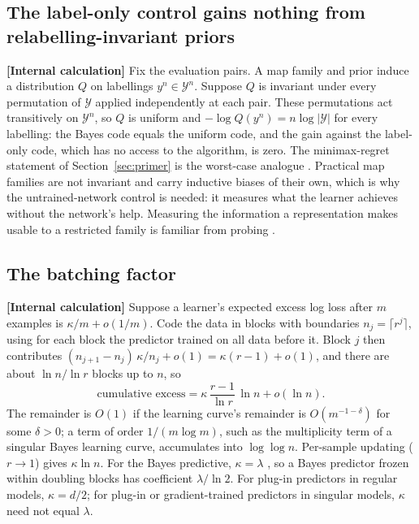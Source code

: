 \documentclass[11pt,a4paper]{article}
\newcommand{\evl}[2]{{\small\bfseries\color{#1}[#2]}}
\newcommand{\LCalc}{\evl{ccalc}{Internal calculation}}
\begin{document}
\subsection{The label-only control gains nothing from relabelling-invariant priors}

\LCalc{} Fix the evaluation pairs. A map family and prior induce a
distribution $Q$ on labellings $y^n\in\mathcal Y^n$. Suppose $Q$ is
invariant under every permutation of $\mathcal Y$ applied independently at
each pair. These permutations act transitively on $\mathcal Y^n$, so $Q$ is
uniform and $-\log Q(y^n)=n\log|\mathcal Y|$ for every labelling: the Bayes
code equals the uniform code, and the gain against the label-only code,
which has no access to the algorithm, is zero. The minimax-regret statement
of Section~\ref{sec:primer} is the worst-case analogue
\cite{shtarkov1987}. Practical map families are not invariant and carry
inductive biases of their own, which is why the untrained-network control
is needed: it measures what the learner achieves without the network's
help. Measuring the information a representation makes usable to a
restricted family is familiar from probing
\cite{pimentel2020info,xu2020,voita2020}.

\subsection{The batching factor}
\label{app:batch}

\LCalc{} Suppose a learner's expected excess log loss after $m$ examples is
$\kappa/m+o(1/m)$. Code the data in blocks with boundaries
$n_j=\lceil r^j\rceil$, using for each block the predictor trained on all
data before it. Block $j$ then contributes
$(n_{j+1}-n_j)\,\kappa/n_j+o(1)=\kappa(r-1)+o(1)$, and there are about
$\ln n/\ln r$ blocks up to $n$, so
\begin{equation}
\text{cumulative excess}=\kappa\,\frac{r-1}{\ln r}\,\ln n+o(\ln n).
\end{equation}
The remainder is $O(1)$ if the learning curve's remainder is $O(m^{-1-\delta})$ for some $\delta>0$; a term of order $1/(m\log m)$, such as the multiplicity term of a singular Bayes learning curve, accumulates into $\log\log n$. Per-sample updating ($r\to1$) gives $\kappa\ln n$. For the Bayes predictive,
$\kappa=\lambda$ \cite{watanabe2009}, so a Bayes predictor frozen within
doubling blocks has coefficient $\lambda/\ln2$. For plug-in predictors in
regular models, $\kappa=d/2$; for plug-in or gradient-trained predictors in
singular models, $\kappa$ need not equal $\lambda$.
\end{document}
